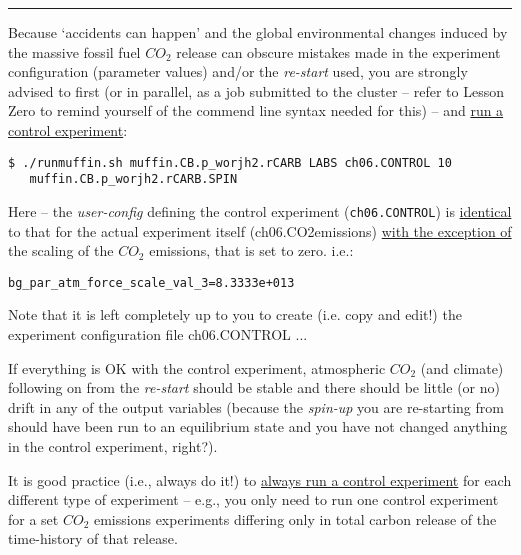 \vspace{1mm}
\noindent\rule{4cm}{0.1mm}
\vspace{2mm}

\noindent Because ‘accidents can happen’ and the global environmental changes induced by the massive fossil fuel \(CO_{2}\) release can obscure mistakes made in the experiment configuration (parameter values) and/or the \textit{re-start} used, you are strongly advised to first (or in parallel, as a job submitted to the cluster – refer to Lesson Zero to remind yourself of the commend line syntax needed for this) --  and \uline{run a control experiment}:
\vspace{-2pt}\small\begin{verbatim}
$ ./runmuffin.sh muffin.CB.p_worjh2.rCARB LABS ch06.CONTROL 10
   muffin.CB.p_worjh2.rCARB.SPIN
\end{verbatim}\normalsize\vspace{-2pt}
Here – the \textit{user-config} defining the control experiment (\texttt{ch06.CONTROL}) is \uline{identical} to that for the actual experiment itself (\textsf{\footnotesize ch06.CO2emissions}) \uline{with the exception of} the scaling of the \(CO_{2}\) emissions, that is set to zero. i.e.:
\vspace{-0pt}\small\begin{verbatim}
bg_par_atm_force_scale_val_3=8.3333e+013
\end{verbatim}\normalsize\vspace{-2pt}

Note that it is left completely up to you to create (i.e. copy and edit!) the experiment configuration file \textsf{\footnotesize ch06.CONTROL} ...

\vspace{1mm}

If everything is OK with the control experiment, atmospheric \(CO_{2}\) (and climate) following on from the \textit{re-start} should be stable and there should be little (or no) drift in any of the output variables (because the \textit{spin-up} you are re-starting from should have been run to an equilibrium state and you have not changed anything in the control experiment, right?).

\vspace{1mm}

It is good practice (i.e., always do it!) to \uline{always run a control experiment} for each different type of experiment – e.g., you only need to run one control experiment for a set \(CO_{2}\) emissions experiments differing only in total carbon release of the time-history of that release.

